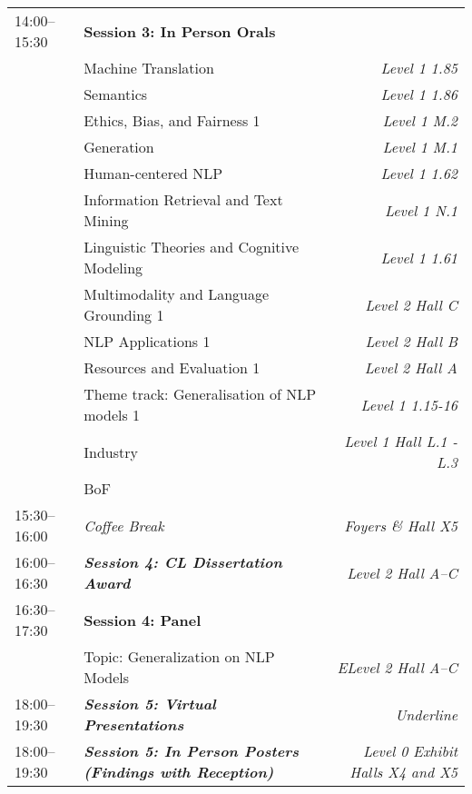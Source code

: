 \begin{xltabular}{\linewidth}{l X r}
    14:00--15:30    &   \textbf{Session 3: In Person Orals}   &   \\
    &   Machine Translation   &   \textit{Level 1 1.85} \\
    &   Semantics  &   \textit{Level 1 1.86} \\
    &   Ethics, Bias, and Fairness 1  &   \textit{Level 1 M.2} \\
    &   Generation  &   \textit{Level 1 M.1} \\
    &   Human-centered NLP  &   \textit{Level 1 1.62} \\
    &   Information Retrieval and Text Mining  &   \textit{Level 1 N.1} \\
    &   Linguistic Theories and Cognitive Modeling  &   \textit{Level 1 1.61} \\
    &   Multimodality and Language Grounding 1  &   \textit{Level 2 Hall C} \\
    &   NLP Applications 1  &   \textit{Level 2 Hall B} \\
    &   Resources and Evaluation 1  &   \textit{Level 2 Hall A} \\
    &   Theme track: Generalisation of NLP models 1  &   \textit{Level 1 1.15-16} \\
    &   Industry  &   \textit{Level 1 Hall L.1 - L.3} \\
    &   BoF &   \\

    15:30--16:00    &   \textit{Coffee Break}    &  \textit{Foyers \& Hall X5} \\

    16:00--16:30    &   \textit{\textbf{Session 4: CL Dissertation Award}}    &  \textit{Level 2 Hall A--C} \\

    16:30--17:30    &   \textbf{Session 4: Panel}  &   \\
    &   Topic: Generalization on NLP Models    &   \textit{ELevel 2 Hall A--C} \\

    18:00--19:30    &   \textit{\textbf{Session 5: Virtual Presentations}}    & \textit{Underline}  \\
    18:00--19:30    &   \textit{\textbf{Session 5: In Person Posters (Findings with Reception)}}    &  \textit{Level 0 Exhibit Halls X4 and X5} \\


\end{xltabular}

\clearpage


